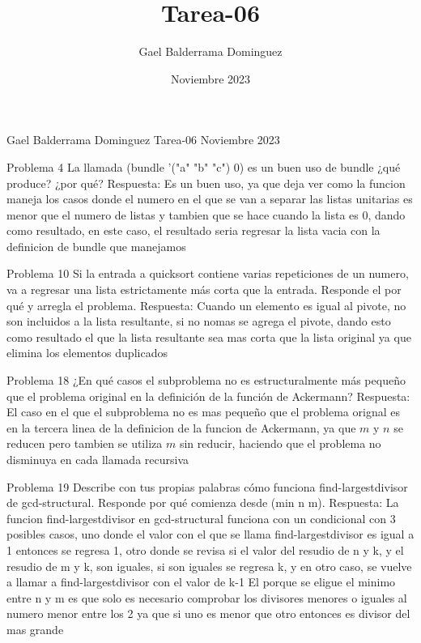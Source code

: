 \documentclass{article}
\author{Gael Balderrama Dominguez}
\title{Tarea-06}
\date{Noviembre 2023}
\begin{document}
\begin{center}
    Gael Balderrama Dominguez \linebreak
    Tarea-06 \linebreak
    Noviembre 2023 \linebreak
\end{center}
Problema 4 \newline
    La llamada (bundle '("a" "b" "c") 0) es un buen uso de bundle ¿qué produce? ¿por qué? \newline
    Respuesta: \newline
    Es un buen uso, ya que deja ver como la funcion maneja los casos donde el numero en el que se van a separar las listas unitarias es menor que el numero de listas y tambien que se hace cuando la lista es 0, dando como resultado, en este caso, el resultado seria regresar la lista vacia con la definicion de bundle que manejamos

Problema 10 \newline
    Si la entrada a quicksort contiene varias repeticiones de un numero, va a regresar una lista estrictamente más corta que la entrada. Responde
    el por qué y arregla el problema. \newline
    Respuesta: \newline
    Cuando un elemento es igual al pivote, no son incluidos a la lista resultante, si no nomas se agrega el pivote, dando esto como resultado el que la lista resultante sea mas corta que la lista original ya que elimina los elementos duplicados

Problema 18 \newline
    ¿En qué casos el subproblema no es estructuralmente más pequeño que el problema original en la definición de la función de Ackermann?\newline
    Respuesta: \newline
    El caso en el que el subproblema no es mas pequeño que el problema orignal es en la tercera linea de la definicion de la funcion de Ackermann, ya que $m$ y $n$ se reducen pero tambien se utiliza $m$ sin reducir, haciendo que el problema no disminuya en cada llamada recursiva 

Problema 19 \newline
    Describe con tus propias palabras cómo funciona find-largestdivisor de gcd-structural. Responde por qué comienza desde (min n m).\newline
    Respuesta: \newline
    La funcion find-largestdivisor en gcd-structural funciona con un condicional con 3 posibles casos, uno donde el valor con el que se llama find-largestdivisor es igual a 1 entonces se regresa 1, otro donde se revisa si el valor del resudio de n y k, y el resudio de m y k, son iguales, si son iguales se regresa k, y en otro caso, se vuelve a llamar a find-largestdivisor con el valor de k-1
    El porque se eligue el minimo entre n y m es que solo es necesario comprobar los divisores menores o iguales al numero menor entre los 2 ya que si uno es menor que otro entonces es divisor del mas grande\newline 
\end{document}

